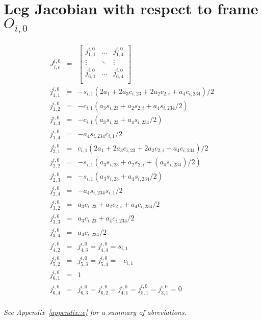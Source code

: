 \chapter{Leg Jacobian with respect to frame $O_{i,0}$}
\label{appendix::a}
	\vspace{-10mm}
	\begin{eqnarray*}
		J^{i,0}_{i,e} &=& 
		\left[
			\begin{array}{ccc}
				j_{1,1}^{i,0}	& \ldots 		& j_{1,4}^{i,0} 	\\
				\vdots 			& \ddots 		& \vdots 			\\
				j_{6,1}^{i,0}	& \ldots 	 	& j_{6,4}^{i,0} 	\\
			\end{array}
		\right]\\
		j_{1,1}^{i,0} &=& -s_{i,1} (2 a_{1} + 2 a_{3} c_{i,23} + 2 a_{2} c_{2,i} + a_{4} c_{i,234})/2\nonumber\\
		j_{1,2}^{i,0} &=& -c_{i,1} (a_{3} s_{i,23} + a_{2} s_{2,i} + a_{4} s_{i,234}/2)				\nonumber\\
		j_{1,3}^{i,0} &=& -c_{i,1} (a_{3} s_{i,23} + a_{4} s_{i,234}/2)								\nonumber\\
		j_{1,4}^{i,0} &=& -a_{4} s_{i,234} c_{i,1}/2 												\nonumber\\
		j_{2,1}^{i,0} &=& c_{i,1} (2 a_{1} + 2 a_{3} c_{i,23} + 2 a_{2} c_{2,i} + a_{4} c_{i,234})/2\nonumber\\
		j_{2,2}^{i,0} &=& -s_{i,1} (a_{3} s_{i,23} + a_{2} s_{2,i} + (a_{4} s_{i,234})/2)				\nonumber\\
		j_{2,3}^{i,0} &=& -s_{i,1} (a_{3} s_{i,23} + a_{4} s_{i,234}/2)								\nonumber\\
		j_{2,4}^{i,0} &=& -a_{4} s_{i,234} s_{i,1}/2 												\nonumber\\
		j_{3,2}^{i,0} &=& a_{3} c_{i,23} + a_{2} c_{2,i} + a_{4} c_{i,234}/2						\nonumber\\
		j_{3,3}^{i,0} &=& a_{3} c_{i,23} + a_{4} c_{i,234}/2										\nonumber\\
		j_{3,4}^{i,0} &=& a_{4} c_{i,234}/2 														\nonumber\\
		j_{4,2}^{i,0} &=& j_{4,3}^{i,0} = j_{4,4}^{i,0} = s_{i,1}									\nonumber\\
		j_{5,2}^{i,0} &=& j_{5,3}^{i,0}	= j_{5,4}^{i,0}	= -c_{i,1}									\nonumber\\
		j_{6,1}^{i,0} &=& 1																			\nonumber\\
		j_{6,4}^{i,0} &=& j_{6,3}^{i,0} = j_{6,2}^{i,0} = j_{4,1}^{i,0} = j_{5,1}^{i,0} = j_{3,1}^{i,0} = 0															\nonumber\\
		\label{eq::leg_jacobian}
	\end{eqnarray*}

	\noindent
	\emph{See Appendix~\ref{appendix::e} for a summary of abreviations.}
